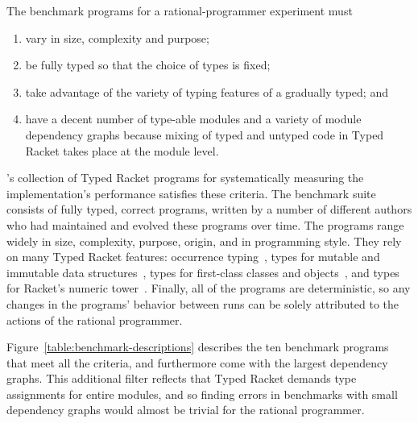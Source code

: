 
The benchmark programs for a rational-programmer experiment must 
\begin{enumerate}
   
\item vary in size, complexity and purpose;

\item be fully typed so that the choice of types is fixed; 
    
\item take advantage of the variety of typing features of a gradually
typed; and

\item have a decent number of type-able modules and a variety of module dependency graphs
 because mixing of typed and untyped code in Typed Racket takes place at the
 module level. 

\end{enumerate}

\citet{gtnffvf-jfp-2019}'s collection of Typed Racket programs for
systematically measuring the implementation's performance satisfies these
criteria. The benchmark suite consists of fully typed, correct programs, written
by a number of different authors who had maintained and evolved these programs
over time. The programs range widely in size, complexity, purpose,
origin, and in programming style. They rely on many Typed Racket features:
occurrence typing~\citep{tf-icfp-2010}, types for mutable and immutable data
structures~\citep{hpst-sfp-2010}, types for first-class classes and
objects~\citep{tsdtf-oopsla-2012}, and types for Racket's numeric
tower~\citep{stathff-padl-12}.  Finally, all of the programs are deterministic,
so any changes in the programs' behavior between runs can be solely attributed
to the actions of the rational programmer.

Figure~\ref{table:benchmark-descriptions} describes the ten benchmark programs that
meet all the criteria, and furthermore come with the largest dependency graphs.
This additional filter reflects that Typed Racket demands type assignments
for entire modules, and so finding errors in benchmarks with small dependency graphs
would almost be trivial for the rational programmer.
